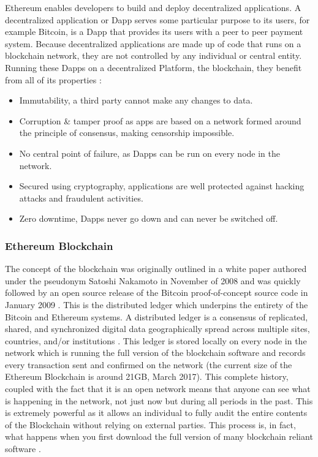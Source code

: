 \documentclass{article}
\begin{document}
Ethereum enables developers to build and deploy decentralized applications. A decentralized application or Dapp serves some particular purpose to its users, for example Bitcoin, is a Dapp that provides its users with a peer to peer payment system. Because decentralized applications are made up of code that runs on a blockchain network, they are not controlled by any individual or central entity. Running these Dapps on a decentralized Platform, the blockchain, they benefit from all of its properties \citep{54_ethereum_explained_2017}:

\begin{itemize}
	\item Immutability, a third party cannot make any changes to data.

	\item Corruption \& tamper proof as apps are based on a network formed around the principle of consensus, making censorship impossible.

	\item No central point of failure, as Dapps can be run on every node in the network.

	\item Secured using cryptography, applications are well protected against hacking attacks and fraudulent activities.

	\item Zero downtime, Dapps never go down and can never be switched off.

\end{itemize}

\cleardoublepage
\subsubsection{Ethereum Blockchain}
The concept of the blockchain was originally outlined in a white paper \citep{12_nakamoto_2008} authored under the pseudonym Satoshi Nakamoto in November of 2008 and was quickly followed by an open source release of the Bitcoin proof-of-concept source code in January 2009 \citep{13_nakamoto_2009}. This is the distributed ledger which underpins the entirety of the Bitcoin and Ethereum systems. A distributed ledger is a consensus of replicated, shared, and synchronized digital data geographically spread across multiple sites, countries, and/or institutions \citep{24_distributed_ledgers_and_blockchain_technology_2016}. This ledger is stored locally on every node in the network which is running the full version of the blockchain software \citep{14_bitcoin_2009} and records every transaction sent and confirmed on the network (the current size of the Ethereum Blockchain is around 21GB, March 2017\citep{25_blockchain_size_2016}). This complete history, coupled with the fact that it is an open network means that anyone can see what is happening in the network, not just now but during all periods in the past. This is extremely powerful as it allows an individual to fully audit the entire contents of the Blockchain without relying on external parties. This process is, in fact, what happens when you first download the full version of many blockchain reliant software \citep{20_developer_guide_bitcoin_2016}.
\end{document}
